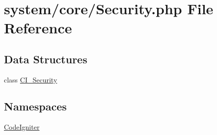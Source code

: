 \hypertarget{_security_8php}{}\section{system/core/\+Security.php File Reference}
\label{_security_8php}
\subsection*{Data Structures}
\begin{DoxyCompactItemize}
\item 
class \mbox{\hyperlink{class_c_i___security}{C\+I\+\_\+\+Security}}
\end{DoxyCompactItemize}
\subsection*{Namespaces}
\begin{DoxyCompactItemize}
\item 
 \mbox{\hyperlink{namespace_code_igniter}{Code\+Igniter}}
\end{DoxyCompactItemize}
